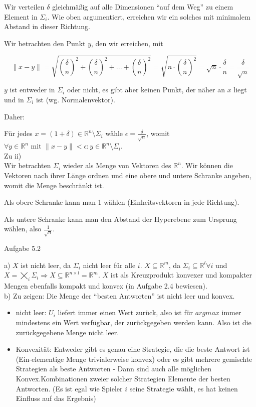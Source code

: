 \documentclass{scrartcl}
\begin{document}
Wir verteilen $\delta$ gleichmäßig
auf alle Dimensionen "`auf dem Weg"' zu einem Element in $\Sigma_i$. Wie oben argumentiert, erreichen wir
ein solches mit minimalem Abstand in dieser Richtung.

Wir betrachten den Punkt $y$, den wir erreichen, mit

\[\|x - y\| = \sqrt{(\frac{\delta}{n})^2 + (\frac{\delta}{n})^2 + ... + (\frac{\delta}{n})^2} = 
\sqrt{n \cdot (\frac{\delta}{n})^2} = \sqrt{n} \cdot \frac{\delta}{n} = \frac{\delta}{\sqrt{n}}
\]

$y$ ist entweder in $\Sigma_i$ oder nicht, es gibt aber keinen Punkt, der näher an $x$ liegt und in
$\Sigma_i$ ist (wg. Normalenvektor).

Daher: 

Für jedes $x = (1 + \delta) \in \mathbb{R}^n \setminus \Sigma_i$ wähle $\epsilon = \frac{\delta}
{\sqrt{n}}$, womit $\forall y \in \mathbb{R}^n \text{ mit } \|x-y\| < \epsilon : y \in \mathbb{R}^n 
\setminus \Sigma_i$. \\

Zu ii) \\

Wir betrachten $\Sigma_i$ wieder als Menge von Vektoren des $\mathbb{R}^n$. Wir können die Vektoren nach
ihrer Länge ordnen und eine obere und untere Schranke angeben, womit die Menge beschränkt ist.

Als obere Schranke kann man 1 wählen (Einheitsvektoren in jede Richtung).

Als untere Schranke kann man den Abstand der Hyperebene zum Ursprung wählen, also $\frac{1}{\sqrt{n}}$. \\

\begin{Large}
Aufgabe 5.2\\[0.0cm]
\end{Large}

a) $X$ ist nicht leer, da $\Sigma_i$ nicht leer für alle $i$. $X \subseteq \mathbb{R}^m$, da $\Sigma_i
\subseteq \mathbb{R}^l \forall i$ und $X = \bigtimes_{i} \Sigma_i \Rightarrow X \subseteq 
\mathbb{R}^{n \times l} = \mathbb{R}^m$. $X$ ist als Kreuzprodukt konvexer und kompakter Mengen ebenfalls
kompakt und konvex (in Aufgabe 2.4 bewiesen). \\

b) Zu zeigen: Die Menge der "`besten Antworten"' ist nicht leer und konvex. \\

\begin{itemize}
\item{nicht leer: $U_i$ liefert immer einen Wert zurück, also ist für $arg max$ immer mindestens ein Wert
verfügbar, der zurückgegeben werden kann. Also ist die zurückgegebene Menge nicht leer.}
\item{Konvexität: Entweder gibt es genau eine Strategie, die die beste Antwort ist (Ein-elementige Menge
trivialerweise konvex) oder es gibt mehrere gemischte Strategien als beste Antworten - Dann sind auch alle
möglichen Konvex.Kombinationen zweier solcher Strategien Elemente der besten Antworten. (Es ist egal wie Spieler
$i$ seine Strategie wählt, es hat keinen Einfluss auf das Ergebnis)}
\end{itemize}
\end{document}

